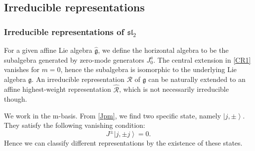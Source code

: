 \documentclass[10pt,a4paper]{article}
\numberwithin{equation}{section}
\newcommand{\ket}[1]{\left| #1 \right\rangle}
\begin{document}
\subsection{Irreducible representations}
\subsubsection*{Irreducible representations of \texorpdfstring{$\mathfrak{sl}_{2}$}{Lg}}
For a given affine Lie algebra $\widehat{\mathfrak{g}}$, we define the horizontal algebra to be the subalgebra generated by zero-mode 
generators $J^{a}_{0}$. The central extension in \ref{CR1} vanishes for $m = 0$, hence the subalgebra is isomorphic to the underlying 
Lie algebra $\mathfrak{g}$. An irreducible representation $\mathcal{R}$ of $\mathfrak{g}$ can be naturally extended to an affine 
highest-weight representation $\widehat{\mathcal{R}}$, which is not necessarily irreducible though.

We work in the m-basis. From \ref{Jpm}, we find two specific state, namely $\ket{j,\pm}$. They satisfy the following vanishing condition:
\begin{equation}
    J^{\pm} \ket{j,\pm j} = 0.
\end{equation}
Hence we can classify different representations by the existence of these states.
\end{document}
